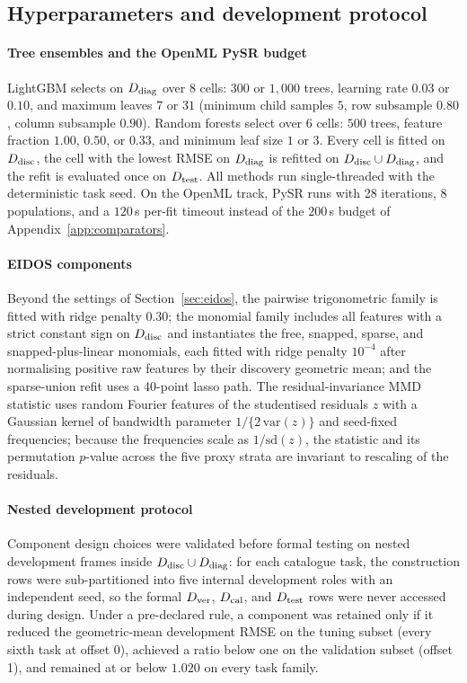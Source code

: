 \subsection{Hyperparameters and development protocol}\label{app:settings}

\paragraph{Tree ensembles and the OpenML PySR budget} LightGBM selects on \(D_{\rm diag}\) over 8 cells: \(300\) or \(1{,}000\) trees, learning rate \(0.03\) or \(0.10\), and maximum leaves \(7\) or \(31\) (minimum child samples \(5\), row subsample \(0.80\), column subsample \(0.90\)). Random forests select over 6 cells: \(500\) trees, feature fraction \(1.00\), \(0.50\), or \(0.33\), and minimum leaf size \(1\) or \(3\). Every cell is fitted on \(D_{\rm disc}\), the cell with the lowest RMSE on \(D_{\rm diag}\) is refitted on \(D_{\rm disc}\cup D_{\rm diag}\), and the refit is evaluated once on \(D_{\rm test}\). All methods run single-threaded with the deterministic task seed. On the OpenML track, PySR runs with 28 iterations, 8 populations, and a \(120\)\,s per-fit timeout instead of the \(200\)\,s budget of Appendix~\ref{app:comparators}.

\paragraph{EIDOS components} Beyond the settings of Section~\ref{sec:eidos}, the pairwise trigonometric family is fitted with ridge penalty \(0.30\); the monomial family includes all features with a strict constant sign on \(D_{\rm disc}\) and instantiates the free, snapped, sparse, and snapped-plus-linear monomials, each fitted with ridge penalty \(10^{-4}\) after normalising positive raw features by their discovery geometric mean; and the sparse-union refit uses a 40-point lasso path. The residual-invariance MMD statistic uses random Fourier features \citep{rahimi2007rff} of the studentised residuals \(z\) with a Gaussian kernel of bandwidth parameter \(1/\{2\,\mathrm{var}(z)\}\) and seed-fixed frequencies; because the frequencies scale as \(1/\mathrm{sd}(z)\), the statistic and its permutation \(p\)-value across the five proxy strata are invariant to rescaling of the residuals.

\paragraph{Nested development protocol} Component design choices were validated before formal testing on nested development frames inside \(D_{\rm disc}\cup D_{\rm diag}\): for each catalogue task, the construction rows were sub-partitioned into five internal development roles with an independent seed, so the formal \(D_{\rm ver}\), \(D_{\rm cal}\), and \(D_{\rm test}\) rows were never accessed during design. Under a pre-declared rule, a component was retained only if it reduced the geometric-mean development RMSE on the tuning subset (every sixth task at offset 0), achieved a ratio below one on the validation subset (offset 1), and remained at or below \(1.020\) on every task family.

